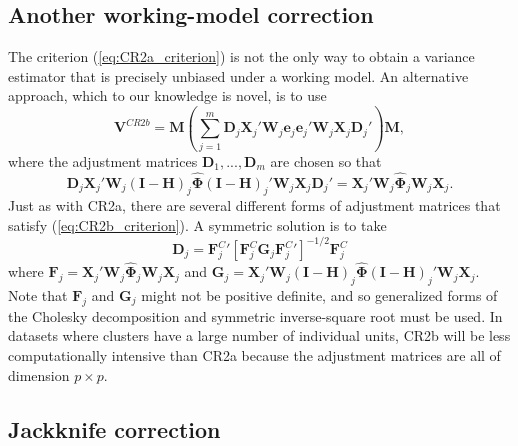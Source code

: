 \documentclass[12pt]{article}\usepackage[]{graphicx}\usepackage[]{color}
\newcommand{\bm}{\mathbf}
\newcommand{\bs}{\boldsymbol}
\begin{document}
\subsection{Another working-model correction}

The criterion (\ref{eq:CR2a_criterion}) is not the only way to obtain a variance estimator that is precisely unbiased under a working model. An alternative approach, which to our knowledge is novel, is to use
\begin{equation}
\label{eq:V_CR2b}
\bm{V}^{CR2b} = \bm{M} \left(\sum_{j=1}^m \bm{D}_j \bm{X}_j' \bm{W}_j \bm{e}_j \bm{e}_j' \bm{W}_j \bm{X}_j \bm{D}_j'\right) \bm{M},
\end{equation}
where the adjustment matrices $\bm{D}_1,...,\bm{D}_m$ are chosen so that
\begin{equation}
\label{eq:CR2b_criterion}
\bm{D}_j \bm{X}_j' \bm{W}_j \left(\bm{I} - \bm{H}\right)_j \hat{\bs\Phi} \left(\bm{I} - \bm{H}\right)_j' \bm{W}_j \bm{X}_j \bm{D}_j' = \bm{X}_j' \bm{W}_j \hat{\bs\Phi}_j \bm{W}_j \bm{X}_j.
\end{equation}
Just as with CR2a, there are several different forms of adjustment matrices that satisfy (\ref{eq:CR2b_criterion}). 
A symmetric solution is to take
\begin{equation}
\bm{D}_j = {\bm{F}_j^C}'\left[\bm{F}_j^C \bm{G}_j {\bm{F}_j^C}'\right]^{-1/2}\bm{F}_j^C
\end{equation}
where $\bm{F}_j = \bm{X}_j' \bm{W}_j \hat{\bs\Phi}_j \bm{W}_j \bm{X}_j$ and $\bm{G}_j = \bm{X}_j' \bm{W}_j \left(\bm{I} - \bm{H}\right)_j \hat{\bs\Phi} \left(\bm{I} - \bm{H}\right)_j' \bm{W}_j \bm{X}_j$. Note that $\bm{F}_j$ and $\bm{G}_j$ might not be positive definite, and so generalized forms of the Cholesky decomposition and symmetric inverse-square root must be used. In datasets where clusters have a large number of individual units, CR2b will be less computationally intensive than CR2a because the adjustment matrices are all of dimension $p \times p$.

\subsection{Jackknife correction}
\end{document}
